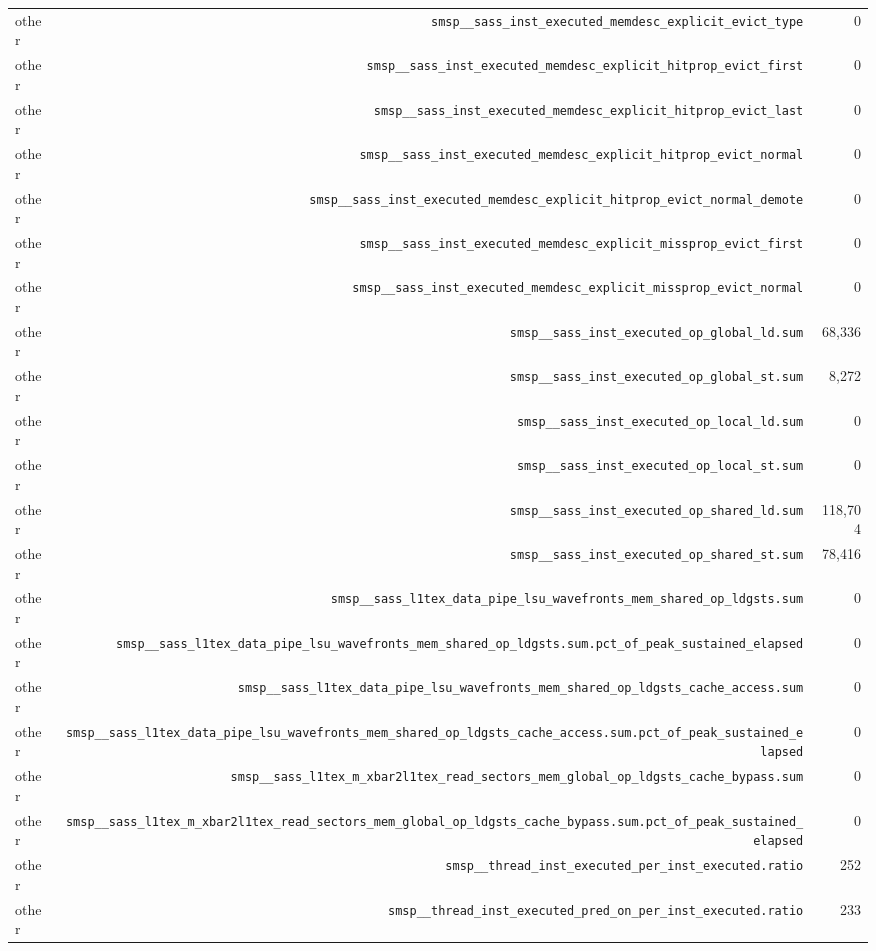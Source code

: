 \begin{table}[h]
\begin{tabular}{|l|r|r|}
other & \texttt{smsp__sass_inst_executed_memdesc_explicit_evict_type} & 0 \\
other & \texttt{smsp__sass_inst_executed_memdesc_explicit_hitprop_evict_first} & 0 \\
other & \texttt{smsp__sass_inst_executed_memdesc_explicit_hitprop_evict_last} & 0 \\
other & \texttt{smsp__sass_inst_executed_memdesc_explicit_hitprop_evict_normal} & 0 \\
other & \texttt{smsp__sass_inst_executed_memdesc_explicit_hitprop_evict_normal_demote} & 0 \\
other & \texttt{smsp__sass_inst_executed_memdesc_explicit_missprop_evict_first} & 0 \\
other & \texttt{smsp__sass_inst_executed_memdesc_explicit_missprop_evict_normal} & 0 \\
other & \texttt{smsp__sass_inst_executed_op_global_ld.sum} & 68,336 \\
other & \texttt{smsp__sass_inst_executed_op_global_st.sum} & 8,272 \\
other & \texttt{smsp__sass_inst_executed_op_local_ld.sum} & 0 \\
other & \texttt{smsp__sass_inst_executed_op_local_st.sum} & 0 \\
other & \texttt{smsp__sass_inst_executed_op_shared_ld.sum} & 118,704 \\
other & \texttt{smsp__sass_inst_executed_op_shared_st.sum} & 78,416 \\
other & \texttt{smsp__sass_l1tex_data_pipe_lsu_wavefronts_mem_shared_op_ldgsts.sum} & 0 \\
other & \texttt{smsp__sass_l1tex_data_pipe_lsu_wavefronts_mem_shared_op_ldgsts.sum.pct_of_peak_sustained_elapsed} & 0 \\
other & \texttt{smsp__sass_l1tex_data_pipe_lsu_wavefronts_mem_shared_op_ldgsts_cache_access.sum} & 0 \\
other & \texttt{smsp__sass_l1tex_data_pipe_lsu_wavefronts_mem_shared_op_ldgsts_cache_access.sum.pct_of_peak_sustained_elapsed} & 0 \\
other & \texttt{smsp__sass_l1tex_m_xbar2l1tex_read_sectors_mem_global_op_ldgsts_cache_bypass.sum} & 0 \\
other & \texttt{smsp__sass_l1tex_m_xbar2l1tex_read_sectors_mem_global_op_ldgsts_cache_bypass.sum.pct_of_peak_sustained_elapsed} & 0 \\
other & \texttt{smsp__thread_inst_executed_per_inst_executed.ratio} & 252 \\
other & \texttt{smsp__thread_inst_executed_pred_on_per_inst_executed.ratio} & 233 \\

\end{tabular}
\end{table}
